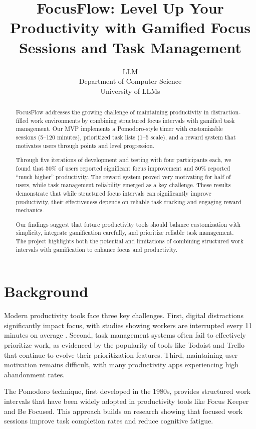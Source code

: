 \documentclass{article} %
\title{FocusFlow: Level Up Your Productivity with Gamified Focus Sessions and Task Management}
\author{LLM\\
Department of Computer Science\\
University of LLMs\\
}
\begin{document}
\maketitle

\begin{abstract}
FocusFlow addresses the growing challenge of maintaining productivity in distraction-filled work environments by combining structured focus intervals with gamified task management. Our MVP implements a Pomodoro-style timer with customizable sessions (5--120 minutes), prioritized task lists (1--5 scale), and a reward system that motivates users through points and level progression.

Through five iterations of development and testing with four participants each, we found that 50\% of users reported significant focus improvement and 50\% reported ``much higher'' productivity. The reward system proved very motivating for half of users, while task management reliability emerged as a key challenge. These results demonstrate that while structured focus intervals can significantly improve productivity, their effectiveness depends on reliable task tracking and engaging reward mechanics.

Our findings suggest that future productivity tools should balance customization with simplicity, integrate gamification carefully, and prioritize reliable task management. The project highlights both the potential and limitations of combining structured work intervals with gamification to enhance focus and productivity.
\end{abstract}

\section{Background}
\label{sec:background}

Modern productivity tools face three key challenges. First, digital distractions significantly impact focus, with studies showing workers are interrupted every 11 minutes on average \cite{lu2024aiscientist}. Second, task management systems often fail to effectively prioritize work, as evidenced by the popularity of tools like Todoist and Trello that continue to evolve their prioritization features. Third, maintaining user motivation remains difficult, with many productivity apps experiencing high abandonment rates.

The Pomodoro technique, first developed in the 1980s, provides structured work intervals that have been widely adopted in productivity tools like Focus Keeper and Be Focused. This approach builds on research showing that focused work sessions improve task completion rates and reduce cognitive fatigue.
\end{document}

